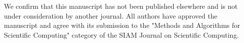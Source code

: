 \documentclass[10pt,a4paper,roman]{moderncv}        %
\begin{document}
We confirm that this manuscript has not been published elsewhere and is not under consideration by another journal. All authors have approved the manuscript and agree with its submission to the "Methods and Algorithms for Scientific Computing" category of the SIAM Journal on Scientific Computing.

\vspace{0.5cm}


\makeletterclosing
\end{document}
